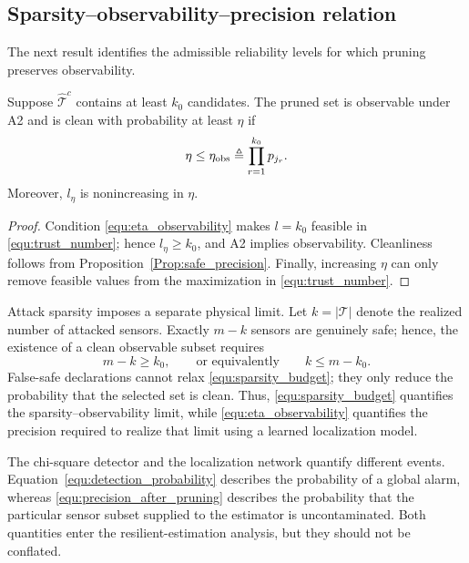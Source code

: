 \subsection{Sparsity--observability--precision relation}
The next result identifies the admissible reliability levels for which pruning preserves observability.

\begin{proposition}\label{Prop:precision_observability}
Suppose $\hat{\mathcal{T}}^c$ contains at least $k_0$ candidates. The pruned set is observable under A2 and is clean with probability at least $\eta$ if
\begin{equation}\label{equ:eta_observability}
\eta\le\eta_{\rm obs}
\triangleq\prod_{r=1}^{k_0}p_{j_r}.
\end{equation}
Moreover, $l_\eta$ is nonincreasing in $\eta$.
\end{proposition}
\begin{proof}
Condition \eqref{equ:eta_observability} makes $l=k_0$ feasible in \eqref{equ:trust_number}; hence $l_\eta\ge k_0$, and A2 implies observability. Cleanliness follows from Proposition~\ref{Prop:safe_precision}. Finally, increasing $\eta$ can only remove feasible values from the maximization in \eqref{equ:trust_number}.
\end{proof}

Attack sparsity imposes a separate physical limit. Let $k=|\mathcal T|$ denote the realized number of attacked sensors. Exactly $m-k$ sensors are genuinely safe; hence, the existence of a clean observable subset requires
\begin{equation}\label{equ:sparsity_budget}
m-k\ge k_0,\qquad\text{or equivalently}\qquad k\le m-k_0.
\end{equation}
False-safe declarations cannot relax \eqref{equ:sparsity_budget}; they only reduce the probability that the selected set is clean. Thus, \eqref{equ:sparsity_budget} quantifies the sparsity--observability limit, while \eqref{equ:eta_observability} quantifies the precision required to realize that limit using a learned localization model.

\begin{remark}
The chi-square detector and the localization network quantify different events. Equation~\eqref{equ:detection_probability} describes the probability of a global alarm, whereas \eqref{equ:precision_after_pruning} describes the probability that the particular sensor subset supplied to the estimator is uncontaminated. Both quantities enter the resilient-estimation analysis, but they should not be conflated.
\end{remark}

